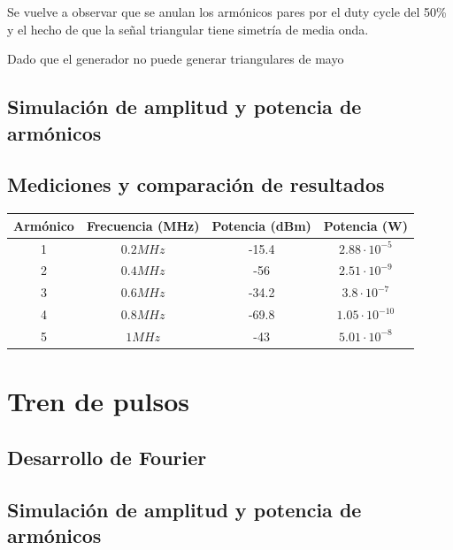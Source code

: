 \documentclass[../../labo_tp5_main.tex]{subfiles}
\begin{document}
Se vuelve a observar que se anulan los armónicos pares por el duty cycle del 50\% y el hecho de que la señal triangular tiene simetría de media onda.\par
Dado que el generador no puede generar triangulares de mayo
\subsection{Simulación de amplitud y potencia de armónicos}



\subsection{Mediciones y comparación de resultados}
\begin{table}[H] %
	\centering
 		\begin{tabular}{||c c c c||} 
 			\hline
			Armónico & Frecuencia (MHz) & Potencia (dBm) & Potencia (W)\\ [0.5ex] 
 			\hline\hline
			1 & $0.2MHz$ & -15.4 & $2.88\cdot 10^{-5}$\\
			2 & $0.4MHz$ & -56 & $2.51\cdot 10^{-9}$\\
			3 & $0.6MHz$ & -34.2 & $3.8\cdot 10^{-7}$\\
			4 & $0.8MHz$ & -69.8 & $1.05\cdot 10^{-10}$\\
			5 & $1MHz$ & -43 & $5.01\cdot 10^{-8}$\\[1ex] 
			\hline
		\end{tabular}
\end{table}


\section{Tren de pulsos}

\subsection{Desarrollo de Fourier}

\subsection{Simulación de amplitud y potencia de armónicos}
\end{document}
